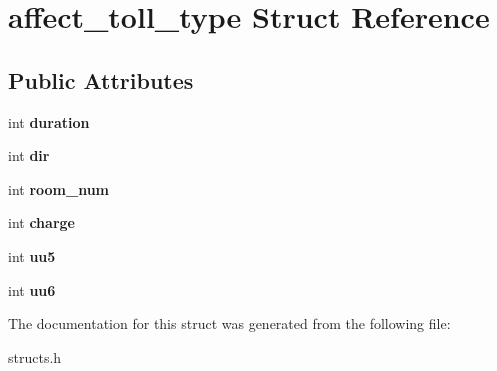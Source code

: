 \hypertarget{structaffect__toll__type}{\section{affect\-\_\-toll\-\_\-type Struct Reference}
\label{structaffect__toll__type}
}
\subsection*{Public Attributes}
\begin{DoxyCompactItemize}
\item 
\hypertarget{structaffect__toll__type_a7159461554549737b4fcc69d0c99bee6}{int {\bfseries duration}}\label{structaffect__toll__type_a7159461554549737b4fcc69d0c99bee6}

\item 
\hypertarget{structaffect__toll__type_a9c441d78d4dafead32c1643d3c34887b}{int {\bfseries dir}}\label{structaffect__toll__type_a9c441d78d4dafead32c1643d3c34887b}

\item 
\hypertarget{structaffect__toll__type_a02094b865c39de6b81e98aac186274de}{int {\bfseries room\-\_\-num}}\label{structaffect__toll__type_a02094b865c39de6b81e98aac186274de}

\item 
\hypertarget{structaffect__toll__type_ae30589b5d098548aaeac661c8e5ae3c7}{int {\bfseries charge}}\label{structaffect__toll__type_ae30589b5d098548aaeac661c8e5ae3c7}

\item 
\hypertarget{structaffect__toll__type_a7e7d65bb8bcd4df59122856581860280}{int {\bfseries uu5}}\label{structaffect__toll__type_a7e7d65bb8bcd4df59122856581860280}

\item 
\hypertarget{structaffect__toll__type_a7fde23a18f8071a1228a71af20b52c63}{int {\bfseries uu6}}\label{structaffect__toll__type_a7fde23a18f8071a1228a71af20b52c63}

\end{DoxyCompactItemize}


The documentation for this struct was generated from the following file\-:\begin{DoxyCompactItemize}
\item 
structs.\-h\end{DoxyCompactItemize}
